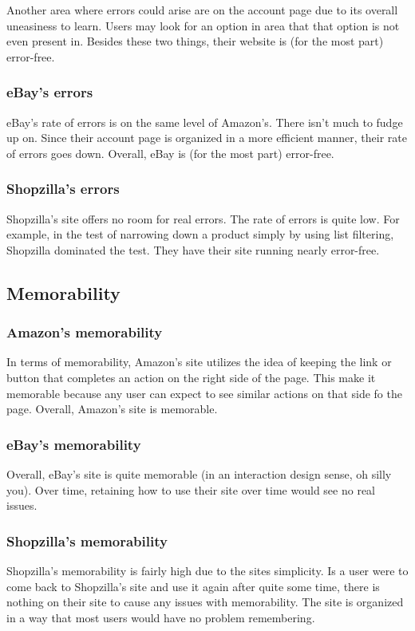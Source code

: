 \documentclass[11pt, oneside]{article}
\begin{document}
		Another area where errors could arise are on the account page due to its overall uneasiness to learn.  Users may look for an option in area that that option is not even present in. Besides these two things, their website is (for the most part) error-free.

		\subsubsection{eBay's errors}
		eBay's rate of errors is on the same level of Amazon's. There isn't much to fudge up on. Since their account page is organized in a more efficient manner, their rate of errors goes down. Overall, eBay is (for the most part) error-free.

		\subsubsection{Shopzilla's errors}
		Shopzilla's site offers no room for real errors. The rate of errors is quite low. For example, in the test of narrowing down a product simply by using list filtering, Shopzilla dominated the test. They have their site running nearly error-free.

	\subsection{Memorability}

		\subsubsection{Amazon's memorability}		
		In terms of memorability, Amazon's site utilizes the idea of keeping the link or button that completes an action on the right side of the page. This make it memorable because any user can expect to see similar actions on that side fo the page. Overall, Amazon's site is memorable.

		\subsubsection{eBay's memorability}
		Overall, eBay's site is quite memorable (in an interaction design sense, oh silly you). Over time, retaining how to use their site over time would see no real issues.

		\subsubsection{Shopzilla's memorability}
		Shopzilla's memorability is fairly high due to the sites simplicity. Is a user were to come back to Shopzilla's site and use it again after quite some time, there is nothing on their site to cause any issues with memorability. The site is organized in a way that most users would have no problem remembering.
\end{document}

